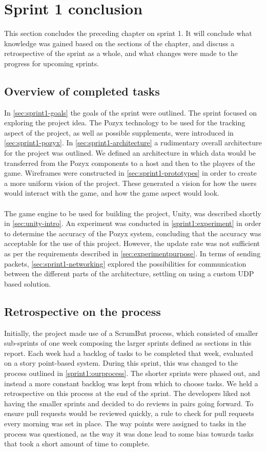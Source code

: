 \section{Sprint 1 conclusion}\label{sec:sprint1-conclusion}
This section concludes the preceding chapter on sprint 1.
It will conclude what knowledge was gained based on the sections of the chapter, and discuss a retrospective of the sprint as a whole, and what changes were made to the progress for upcoming sprints.

\subsection{Overview of completed tasks}
In \autoref{sec:sprint1-goals} the goals of the sprint were outlined.
The sprint focused on exploring the project idea.
The Pozyx technology to be used for the tracking aspect of the project, as well as possible supplements, were introduced in \autoref{sec:sprint1-pozyx}.
In \autoref{sec:sprint1-architecture} a rudimentary overall architecture for the project was outlined.
We defined an architecture in which data would be transferred from the Pozyx components to a host and then to the players of the game.
Wireframes were constructed in \autoref{sec:sprint1-prototypes} in order to create a more uniform vision of the project.
These generated a vision for how the users would interact with the game, and how the game aspect would look.
\\\\
The game engine to be used for building the project, Unity, was described shortly in \autoref{sec:unity-intro}.
An experiment was conducted in \autoref{sprint1:experiment} in order to determine the accuracy of the Pozyx system, concluding that the accuracy was acceptable for the use of this project.
However, the update rate was not sufficient as per the requirements described in \autoref{sec:experimentpurpose}.
In terms of sending packets, \autoref{sec:sprint1-networking} explored the possibilities for communication between the different parts of the architecture, settling on using a custom UDP based solution.

\subsection{Retrospective on the process}\label{sprint1:retrospective}
Initially, the project made use of a ScrumBut process, which consisted of smaller sub-sprints of one week composing the larger sprints defined as sections in this report.
Each week had a backlog of tasks to be completed that week, evaluated on a story point-based system.
During this sprint, this was changed to the process outlined in \ref{sprint1:ourprocess}.
The shorter sprints were phased out, and instead a more constant backlog was kept from which to choose tasks.
We held a retrospective on this process at the end of the sprint.
The developers liked not having the smaller sprints and decided to do reviews in pairs going forward.
To ensure pull requests would be reviewed quickly, a rule to check for pull requests every morning was set in place.
The way points were assigned to tasks in the process was questioned, as the way it was done lead to some bias towards tasks that took a short amount of time to complete.